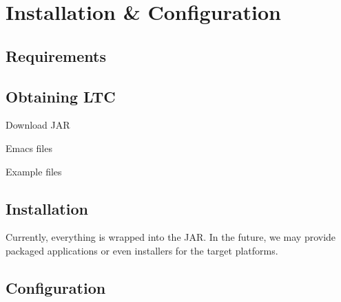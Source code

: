 \chapter{Installation \& Configuration} \label{ch:install}

\section{Requirements}

\section{Obtaining LTC}

Download JAR

Emacs files

Example files

\section{Installation}

Currently, everything is wrapped into the JAR.  In the future, we may provide packaged applications or even installers for the target platforms.

\section{Configuration}

